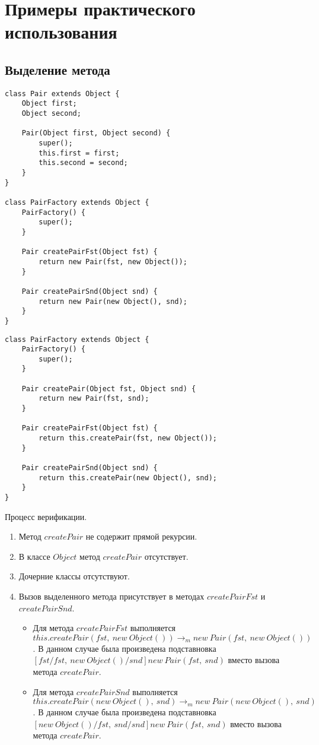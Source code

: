 \chapter{Примеры практического использования}

\section{Выделение метода}
\begin{lstlisting}[float=ht,label=pf-before,caption=Код до выделения метода]
class Pair extends Object {
    Object first;
    Object second;

    Pair(Object first, Object second) {
        super();
        this.first = first;
        this.second = second;
    }
}

class PairFactory extends Object {
    PairFactory() {
        super();
    }

    Pair createPairFst(Object fst) {
        return new Pair(fst, new Object());
    }

    Pair createPairSnd(Object snd) {
        return new Pair(new Object(), snd);
    }
}
\end{lstlisting}

\begin{lstlisting}[float=ht,label=pf-after,caption=Код после выделения метода]
class PairFactory extends Object {
    PairFactory() {
        super();
    }

    Pair createPair(Object fst, Object snd) {
    	return new Pair(fst, snd);
    }

    Pair createPairFst(Object fst) {
        return this.createPair(fst, new Object());
    }

    Pair createPairSnd(Object snd) {
        return this.createPair(new Object(), snd);
    }
}
\end{lstlisting}


Процесс верификации.
\begin{enumerate}
    \item Метод $createPair$ не содержит прямой рекурсии.
    \item В классе $Object$ метод $createPair$ отсутствует.
    \item Дочерние классы отсутствуют.
    \item Вызов выделенного метода присутствует в методах $createPairFst$ и $createPairSnd$.
    \begin{itemize}
        \item Для метода $createPairFst$ выполняется $this.createPair(fst,\ new\ Object()) \rightarrow_m new\ Pair(fst,\ new\ Object())$.
        В данном случае была произведена подставновка $[fst/fst,\ new\ Object()/snd]new\ Pair(fst,\ snd)$ вместо вызова метода $createPair$.
        \item Для метода $createPairSnd$ выполняется $this.createPair(new\ Object(),\ snd) \rightarrow_m new\ Pair(new\ Object(),\ snd)$.
        В данном случае была произведена подставновка $[new\ Object()/fst,\ snd/snd]new\ Pair(fst,\ snd)$ вместо вызова метода $createPair$.
    \end{itemize}
\end{enumerate}

